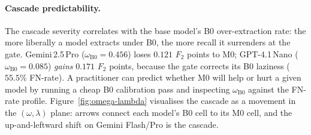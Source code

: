 \paragraph{Cascade predictability.}
The cascade severity correlates with the base model's B0 over-extraction rate:
the more liberally a model extracts under B0, the more recall it surrenders at
the gate. Gemini\,2.5\,Pro ($\omega_{\text{B0}} = 0.456$) loses $0.121$ $F_2$
points to M0; GPT-4.1\,Nano ($\omega_{\text{B0}} = 0.085$) \emph{gains}
$0.171$ $F_2$ points, because the gate corrects its B0 laziness ($55.5\%$
FN-rate). A practitioner can predict whether M0 will help or hurt a given
model by running a cheap B0 calibration pass and inspecting $\omega_{\text{B0}}$
against the FN-rate profile. Figure~\ref{fig:omega-lambda} visualises the
cascade as a movement in the $(\omega, \lambda)$ plane: arrows connect each
model's B0 cell to its M0 cell, and the up-and-leftward shift on Gemini
Flash/Pro is the cascade.

